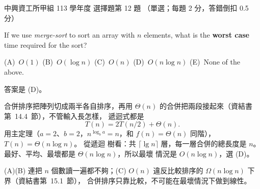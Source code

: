 \begin{pastexam}[label={px:nchu-113-dsa-12}]{中興資工所甲組 113 學年度 選擇題第 12 題}
（單選；每題 2 分，答錯倒扣 0.5 分）

If we use \textit{merge-sort} to sort an array with $n$ elements, what is the \textbf{worst case} time required
for the sort?

(A)~$O(1)$ \qquad (B)~$O(\log n)$ \qquad (C)~$O(n)$ \qquad (D)~$O(n\log n)$ \qquad (E)~None of the above.
\end{pastexam}

\begin{pastsoln}
答案是 (D)。

合併排序把陣列切成兩半各自排序，再用 $\Theta(n)$ 的合併把兩段接起來（資結書第~14.4~節），不管輸入長怎樣，
遞迴式都是
\[
T(n) = 2T(n/2) + \Theta(n).
\]
用主定理（$a = 2$、$b = 2$，$n^{\log_b a} = n$，和 $f(n) = \Theta(n)$ 同階），$T(n) = \Theta(n \log n)$。 從遞迴
樹看：共 $\lceil \lg n \rceil$ 層，每一層合併的總長度是 $n$。 最好、平均、最壞都是 $\Theta(n \log n)$，所以最壞
情況是 $O(n \log n)$，選 (D)。

(A)(B) 連把 $n$ 個數讀一遍都不夠；(C) $O(n)$ 違反比較排序的 $\Omega(n \log n)$ 下界（資結書第~15.1~節），
合併排序只靠比較，不可能在最壞情況下做到線性。
\end{pastsoln}
